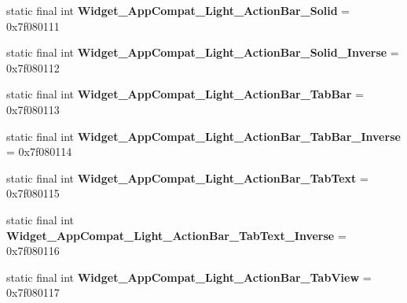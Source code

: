 \begin{DoxyCompactItemize}
\item 
\hypertarget{classandroid_1_1support_1_1design_1_1_r_1_1style_a839a83b5abd51f1a0511646f9e60061f}{}static final int {\bfseries Widget\+\_\+\+App\+Compat\+\_\+\+Light\+\_\+\+Action\+Bar\+\_\+\+Solid} = 0x7f080111\label{classandroid_1_1support_1_1design_1_1_r_1_1style_a839a83b5abd51f1a0511646f9e60061f}

\item 
\hypertarget{classandroid_1_1support_1_1design_1_1_r_1_1style_aa0b0c2ca37bdb2f84bf6177dfa44d787}{}static final int {\bfseries Widget\+\_\+\+App\+Compat\+\_\+\+Light\+\_\+\+Action\+Bar\+\_\+\+Solid\+\_\+\+Inverse} = 0x7f080112\label{classandroid_1_1support_1_1design_1_1_r_1_1style_aa0b0c2ca37bdb2f84bf6177dfa44d787}

\item 
\hypertarget{classandroid_1_1support_1_1design_1_1_r_1_1style_abb13b7b02573cf138e9b71d0bfbe31c9}{}static final int {\bfseries Widget\+\_\+\+App\+Compat\+\_\+\+Light\+\_\+\+Action\+Bar\+\_\+\+Tab\+Bar} = 0x7f080113\label{classandroid_1_1support_1_1design_1_1_r_1_1style_abb13b7b02573cf138e9b71d0bfbe31c9}

\item 
\hypertarget{classandroid_1_1support_1_1design_1_1_r_1_1style_a88d71d2ee7d784d399f6ecca8aa2e9be}{}static final int {\bfseries Widget\+\_\+\+App\+Compat\+\_\+\+Light\+\_\+\+Action\+Bar\+\_\+\+Tab\+Bar\+\_\+\+Inverse} = 0x7f080114\label{classandroid_1_1support_1_1design_1_1_r_1_1style_a88d71d2ee7d784d399f6ecca8aa2e9be}

\item 
\hypertarget{classandroid_1_1support_1_1design_1_1_r_1_1style_a4b115a3c2050ab4bf030e46c11eb60a0}{}static final int {\bfseries Widget\+\_\+\+App\+Compat\+\_\+\+Light\+\_\+\+Action\+Bar\+\_\+\+Tab\+Text} = 0x7f080115\label{classandroid_1_1support_1_1design_1_1_r_1_1style_a4b115a3c2050ab4bf030e46c11eb60a0}

\item 
\hypertarget{classandroid_1_1support_1_1design_1_1_r_1_1style_a7ca113d19597f857720ec90315950010}{}static final int {\bfseries Widget\+\_\+\+App\+Compat\+\_\+\+Light\+\_\+\+Action\+Bar\+\_\+\+Tab\+Text\+\_\+\+Inverse} = 0x7f080116\label{classandroid_1_1support_1_1design_1_1_r_1_1style_a7ca113d19597f857720ec90315950010}

\item 
\hypertarget{classandroid_1_1support_1_1design_1_1_r_1_1style_a4c52b2eae6f6bf30c300ecd89d4d6f05}{}static final int {\bfseries Widget\+\_\+\+App\+Compat\+\_\+\+Light\+\_\+\+Action\+Bar\+\_\+\+Tab\+View} = 0x7f080117\label{classandroid_1_1support_1_1design_1_1_r_1_1style_a4c52b2eae6f6bf30c300ecd89d4d6f05}


\end{DoxyCompactItemize}
